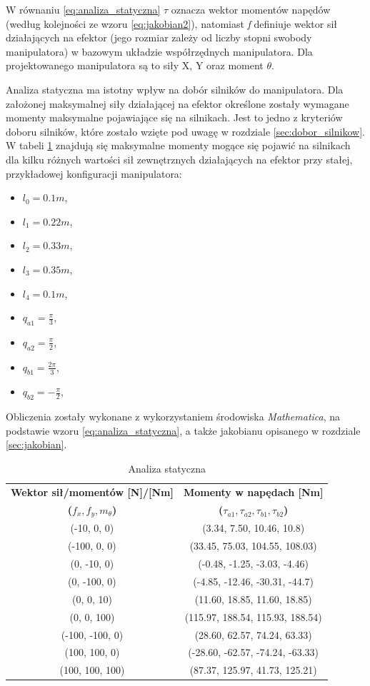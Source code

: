 \documentclass[printmode]{mgr}
\begin{document}
W równaniu \ref{eq:analiza_statyczna} \emph{$\tau$} oznacza wektor momentów napędów (według kolejności ze wzoru \ref{eq:jakobian2}), natomiast
\emph{f} definiuje wektor sił działających na efektor (jego rozmiar zależy od liczby stopni swobody manipulatora) w bazowym
układzie współrzędnych manipulatora. Dla projektowanego manipulatora są to siły X, Y oraz moment $\theta$.

Analiza statyczna ma istotny wpływ na dobór silników do manipulatora. Dla założonej maksymalnej siły działającej na efektor
określone zostały wymagane momenty maksymalne pojawiające się na silnikach. Jest to jedno z kryteriów doboru silników, 
które zostało wzięte pod uwagę w rozdziale \ref{sec:dobor_silnikow}. W tabeli \ref{tab:analiza_statyczna} znajdują się
maksymalne momenty mogące się pojawić na silnikach dla kilku różnych wartości sił zewnętrznych działających na efektor
przy stałej, przykładowej konfiguracji manipulatora:
\begin{itemize}
\item $l_0=0.1m$,
\item $l_1=0.22m$,
\item $l_2=0.33m$,
\item $l_3=0.35m$,
\item $l_4=0.1m$,
\item $q_{a1}=\frac{\pi}{3}$,
\item $q_{a2}=\frac{\pi}{2}$,
\item $q_{b1}=\frac{2\pi}{3}$,
\item $q_{b2}=-\frac{\pi}{2}$,
\end{itemize}

Obliczenia zostały wykonane z wykorzystaniem środowiska \emph{Mathematica}, na podstawie wzoru \ref{eq:analiza_statyczna}, a także
jakobianu opisanego w rozdziale \ref{sec:jakobian}.

\begin{table}[tp]
  \caption{Analiza statyczna}
  \label{tab:analiza_statyczna}
  \centering
  \begin{tabular}{||c|c||}
    \hline\hline
{\bf Wektor sił/momentów [N]/[Nm]} & {\bf Momenty w napędach [Nm]} \\
{\bf ($f_x, f_y, m_{\theta}$)} & {\bf ($\tau_{a1}, \tau_{a2}, \tau_{b1}, \tau_{b2}$)} \\\hline\hline
(-10, 0, 0) & (3.34, 7.50, 10.46, 10.8) \\
(-100, 0, 0) & (33.45, 75.03, 104.55, 108.03) \\
(0, -10, 0) & (-0.48, -1.25, -3.03, -4.46) \\
(0, -100, 0) & (-4.85, -12.46, -30.31, -44.7) \\
(0, 0, 10) & (11.60, 18.85, 11.60, 18.85) \\
(0, 0, 100) & (115.97, 188.54, 115.93, 188.54) \\
(-100, -100, 0) & (28.60, 62.57, 74.24, 63.33) \\
(100, 100, 0) & (-28.60, -62.57, -74.24, -63.33) \\
(100, 100, 100) & (87.37, 125.97, 41.73, 125.21) \\
\hline\hline
  \end{tabular}
\end{table}
\end{document}
